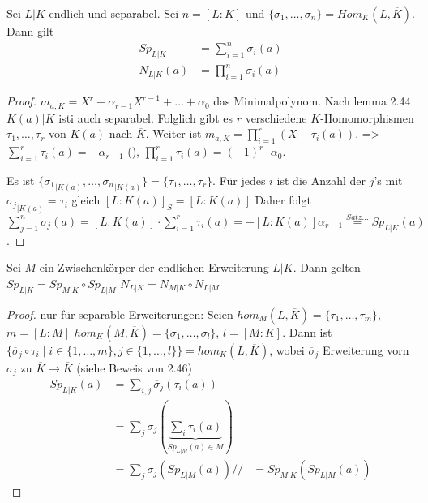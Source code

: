 \documentclass[../main.tex]{subfiles}
\begin{document}
\begin{theorem}
    Sei $L|K$ endlich und separabel.
    Sei $n=[L:K]$ und $\{\sigma_1,\dots,\sigma_n\} = Hom_K(L,\overline{K})$.
    Dann gilt
    \begin{align*}
        Sp_{L|K} &= \sum_{i=1}^n \sigma_i(a)\\
        N_{L|K} (a) &= \prod_{i=1}^n \sigma_i(a)
    \end{align*}
\end{theorem}
\begin{proof}
    $m_{a,K} = X^r+\alpha_{r-1}X^{r-1}+\dots + \alpha_0$
    das Minimalpolynom.
    Nach lemma 2.44 $K(a)|K$ isti auch separabel.
    Folglich gibt es $r$ verschiedene $K$-Homomorphismen $\tau_1,\dots,\tau_r$ von $K(a)$ nach $\overline{K}$.
    Weiter ist $m_{a,K} = \prod_{i=1}^r (X-\tau_i(a))$.
    => $\sum_{i=1}^r\tau_i(a) = -\alpha_{r-1}$ (\TODO[why?]), $\prod_{i=1}^r \tau_i(a) = (-1)^r \cdot \alpha_0$.

    Es ist $\{{\sigma_1}_{|K(a)}, \dots, {\sigma_n}_{|K(a)}\} = \{\tau_1,\dots,\tau_r\}$.
    Für jedes $i$ ist die Anzahl der $j$'s mit ${\sigma_j}_{|K(a)} = \tau_i$ gleich $[L:K(a)]_S = [L:K(a)]$
    Daher folgt $\sum_{j=1}^n\sigma_j(a) = [L:K(a)]\cdot \sum_{i=1}^r \tau_i(a) = -[L:K(a)]\alpha_{r-1} \overset{Satz...}{ =} Sp_{L|K}(a)$.
\end{proof}
\begin{theorem}
    Sei $M$ ein Zwischenkörper der endlichen Erweiterung $L|K$.
    Dann gelten $Sp_{L|K} = Sp_{M|K}\circ Sp_{L|M}$
    $N_{L|K} = N_{M|K}\circ N_{L|M}$
\end{theorem}
\begin{proof}nur für separable Erweiterungen:
    Seien $hom_M(L,\overline{K}) = \{\tau_1,\dots,\tau_m\}$, $m=[L:M]$
    $hom_K(M,\overline{K}) = \{\sigma_1,\dots,\sigma_l\}$, $l = [M:K]$.
    Dann ist $\{\overline{\sigma}_j\circ\tau_i\mid i \in \{1,\dots,m\}, j\in \{1,\dots,l\}\} = hom_K(L,\overline{K})$, wobei $\overline{\sigma}_j$ Erweiterung vorn $\sigma_j$ zu $\overline{K}\rightarrow \overline{K}$ (siehe Beweis von 2.46)
    \begin{align*}
        Sp_{L|K}(a) &= \sum_{i,j} \overline{\sigma}_j(\tau_i(a))\\
        &=\sum_j\overline{\sigma}_j(\underbrace{\sum_i \tau_i (a)}_{Sp_{L|M}(a)\in M})\\
        &= \sum_j \sigma_j (Sp_{L|M} (a))//
        &= Sp_{M|K}(Sp_{L|M}(a))
    \end{align*}
\end{proof}
\end{document}
